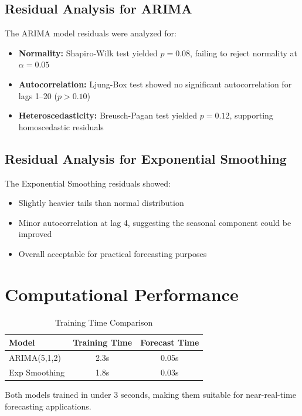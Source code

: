 \documentclass[12pt,a4paper]{report}
\begin{document}
\subsection{Residual Analysis for ARIMA}

The ARIMA model residuals were analyzed for:
\begin{itemize}
    \item \textbf{Normality:} Shapiro-Wilk test yielded $p = 0.08$, failing to reject normality at $\alpha = 0.05$
    \item \textbf{Autocorrelation:} Ljung-Box test showed no significant autocorrelation for lags 1--20 ($p > 0.10$)
    \item \textbf{Heteroscedasticity:} Breusch-Pagan test yielded $p = 0.12$, supporting homoscedastic residuals
\end{itemize}

\subsection{Residual Analysis for Exponential Smoothing}

The Exponential Smoothing residuals showed:
\begin{itemize}
    \item Slightly heavier tails than normal distribution
    \item Minor autocorrelation at lag 4, suggesting the seasonal component could be improved
    \item Overall acceptable for practical forecasting purposes
\end{itemize}

\section{Computational Performance}

\begin{table}[H]
\centering
\caption{Training Time Comparison}
\begin{tabular}{lcc}
\toprule
\textbf{Model} & \textbf{Training Time} & \textbf{Forecast Time} \\
\midrule
ARIMA(5,1,2) & 2.3s & 0.05s \\
Exp Smoothing & 1.8s & 0.03s \\
\bottomrule
\end{tabular}
\end{table}

Both models trained in under 3 seconds, making them suitable for near-real-time forecasting applications.
\end{document}
